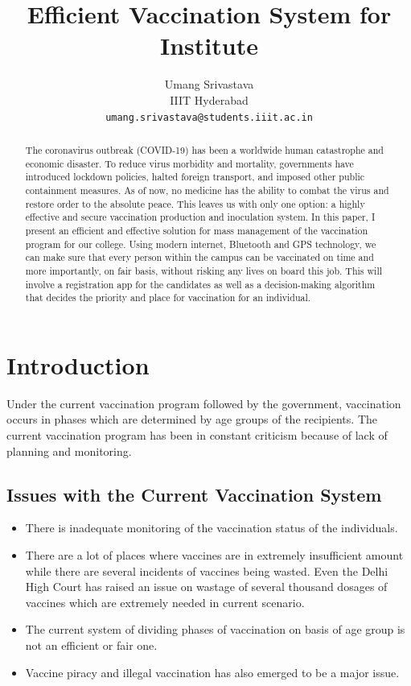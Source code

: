\documentclass[10pt,twocolumn,letterpaper]{article}
\begin{document}
\title{Efficient Vaccination System for Institute}

\author{Umang Srivastava\\
	IIIT Hyderabad\\
	{\tt\small umang.srivastava@students.iiit.ac.in}
}

\maketitle

\begin{abstract}
	The coronavirus outbreak (COVID-19) has been a worldwide human catastrophe and economic disaster. To reduce virus morbidity and mortality, governments have introduced lockdown policies, halted foreign transport, and imposed other public containment measures. As of now, no medicine has the ability to combat the virus and restore order to the absolute peace. This leaves us with only one option: a highly effective and secure vaccination production and inoculation system. In this paper, I present an efficient and effective solution for mass management of the vaccination program for our college. Using modern internet, Bluetooth and GPS technology, we can make sure that every person within the campus can be vaccinated on time and more importantly, on fair basis, without risking any lives on board this job. This will involve a registration app for the candidates as well as a decision-making algorithm that decides the priority and place for vaccination for an individual.
\end{abstract}

\section{Introduction}
Under the current vaccination program followed by the government, vaccination occurs in phases which are determined by age groups of the recipients. The current vaccination program has been in constant criticism because of lack of planning and monitoring.

\subsection{Issues with the Current Vaccination System}

\begin{itemize}
	
	\item There is inadequate monitoring of the vaccination status of the individuals.
	\item There are a lot of places where vaccines are in extremely insufficient amount while there are several incidents of vaccines being wasted. Even the Delhi High Court has raised an issue on wastage of several thousand dosages of vaccines which are extremely needed in current scenario.\cite{highcourt}
	\item The current system of dividing phases of vaccination on basis of age group is not an efficient or fair one.
	\item Vaccine piracy and illegal vaccination has also emerged to be a major issue.
	      
\end{itemize}
\end{document}
